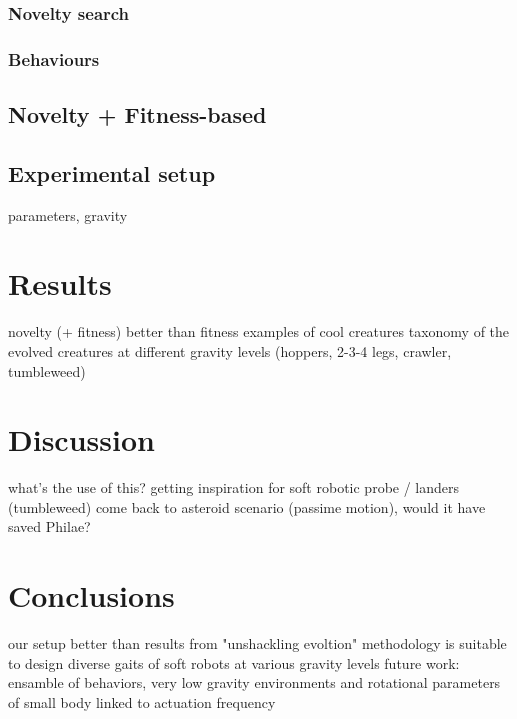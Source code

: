 \documentclass{sig-alternate}
\begin{document}
\subsubsection{Novelty search}



\subsubsection{Behaviours}

\subsection{Novelty + Fitness-based}

\subsection{Experimental setup}
parameters, gravity

\section{Results}
novelty (+ fitness) better than fitness
examples of cool creatures
taxonomy of the evolved creatures at different gravity levels (hoppers, 2-3-4 legs, crawler, tumbleweed) 

\section{Discussion}
what's the use of this?
getting inspiration for soft robotic probe / landers (tumbleweed)
come back to asteroid scenario (passime motion), would it have saved Philae?

\section{Conclusions}
our setup better than results from "unshackling evoltion"
methodology is suitable to design diverse gaits of soft robots at various gravity levels
future work: ensamble of behaviors, very low gravity environments and rotational parameters of small body linked to actuation frequency



\end{document}

